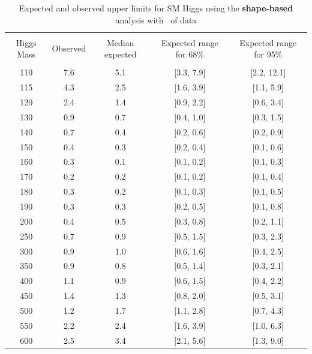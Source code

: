 
\begin{table}[!hbp]
\begin{center}
\begin{tabular}{c c c c c}
\hline
\vspace{-3mm} && \\
 Higgs Mass   & Observed & Median expected & Expected range for 68\% & Expected range for 95\%   \\
\vspace{-3mm} && \\
\hline
110 & 7.6 & 5.1 & [3.3, 7.9] & [2.2, 12.1] \\
115 & 4.3 & 2.5 & [1.6, 3.9] & [1.1, 5.9] \\
120 & 2.4 & 1.4 & [0.9, 2.2] & [0.6, 3.4] \\
130 & 0.9 & 0.7 & [0.4, 1.0] & [0.3, 1.5] \\
140 & 0.7 & 0.4 & [0.2, 0.6] & [0.2, 0.9] \\
150 & 0.4 & 0.3 & [0.2, 0.4] & [0.1, 0.6] \\
160 & 0.3 & 0.1 & [0.1, 0.2] & [0.1, 0.3] \\
170 & 0.2 & 0.2 & [0.1, 0.2] & [0.1, 0.4] \\
180 & 0.3 & 0.2 & [0.1, 0.3] & [0.1, 0.5] \\
190 & 0.3 & 0.3 & [0.2, 0.5] & [0.1, 0.8] \\
200 & 0.4 & 0.5 & [0.3, 0.8] & [0.2, 1.1] \\
250 & 0.7 & 0.9 & [0.5, 1.5] & [0.3, 2.3] \\
300 & 0.9 & 1.0 & [0.6, 1.6] & [0.4, 2.5] \\
350 & 0.9 & 0.8 & [0.5, 1.4] & [0.3, 2.1] \\
400 & 1.1 & 0.9 & [0.6, 1.5] & [0.4, 2.2] \\
450 & 1.4 & 1.3 & [0.8, 2.0] & [0.5, 3.1] \\
500 & 1.2 & 1.7 & [1.1, 2.8] & [0.7, 4.3] \\
550 & 2.2 & 2.4 & [1.6, 3.9] & [1.0, 6.3] \\
600 & 2.5 & 3.4 & [2.1, 5.6] & [1.3, 9.0] \\
\hline
\end{tabular}
\caption{Expected and observed upper limits for SM Higgs using the
  {\bf shape-based} analysis with \intlumi\ of data}
\label{tab:mvabase_uls}
\end{center}
\end{table}

